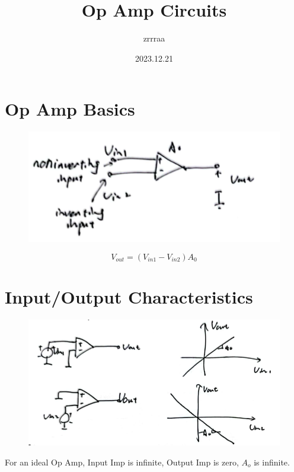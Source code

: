 \documentclass[fontset=windows]{article}
\title{\heiti\zihao{2} Op Amp Circuits}
\author{\songti zrrraa}
\date{2023.12.21}
\begin{document}
\maketitle
\thispagestyle{empty}

\section*{Op Amp Basics}

\begin{figure}[htbp]
    \centering
    \includegraphics[scale=0.8]{1.jpg}
    \captionsetup{labelformat=empty}
    \caption{}
    \label{1}
\end{figure}

$$V_{out}=(V_{in1}-V_{in2})A_0$$

\section*{Input/Output Characteristics}

\begin{figure}[htbp]
    \centering
    \includegraphics[scale=0.8]{2.jpg}
    \captionsetup{labelformat=empty}
    \caption{}
    \label{2}
\end{figure}

For an ideal Op Amp, Input Imp is infinite, Output Imp is zero, $A_o$ is infinite. 
\end{document}
